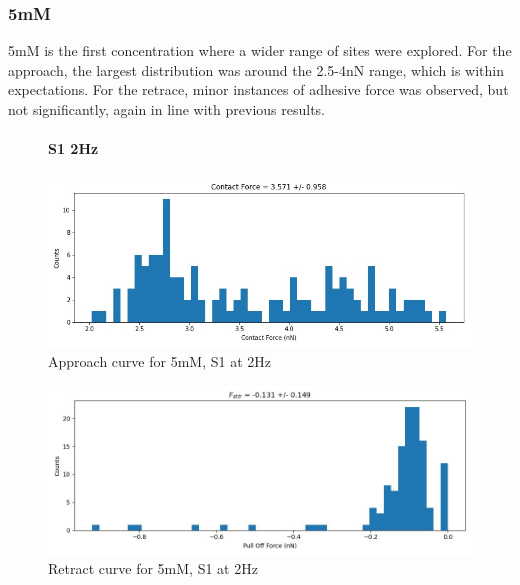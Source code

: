 \newpage

\subsubsection*{5mM}
5mM is the first concentration where a wider range of sites were explored. For the approach, the largest distribution was around the 2.5-4nN range, which is within expectations. For the retrace, minor instances of adhesive force was observed, but not significantly, again in line with previous results.

\begin{figure}[h!]
\paragraph{S1 2Hz}
\centering
\includegraphics[width=\textwidth]{chapter7/Tip speed/5mM/S1 2Hz/approach_f_c_hist.jpg}
\caption{Approach curve for 5mM, S1 at 2Hz}
\end{figure}

\begin{figure}[h!]
\centering
\includegraphics[width=\textwidth]{chapter7/Tip speed/5mM/S1 2Hz/retract_f_a_hist.jpg}
\caption{Retract curve for 5mM, S1 at 2Hz}
\end{figure}
\newpage


